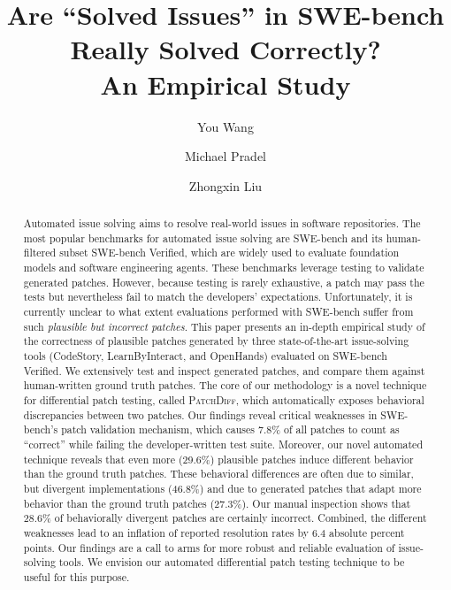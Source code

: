 \documentclass[sigconf]{acmart}
\newcommand{\appname}{{\textsc{PatchDiff}}\xspace}
\begin{document}
\title[Are ``Solved Issues'' in SWE-bench Really Solved Correctly?]{Are ``Solved Issues'' in SWE-bench Really Solved Correctly? \\An Empirical Study}

\author{You Wang}

\author{Michael Pradel}

\author{Zhongxin Liu}










\begin{abstract}


Automated issue solving aims to resolve real-world issues in software repositories.
The most popular benchmarks for automated issue solving are SWE-bench and its human-filtered subset SWE-bench Verified, which are widely used to evaluate foundation models and software engineering agents.
These benchmarks leverage testing to validate generated patches.
However, because testing is rarely exhaustive, a patch may pass the tests but nevertheless fail to match the developers' expectations.
Unfortunately, it is currently unclear to what extent evaluations performed with SWE-bench suffer from such \emph{plausible but incorrect patches}.
This paper presents an in-depth empirical study of the correctness of plausible patches generated by three state-of-the-art issue-solving tools (CodeStory, LearnByInteract, and OpenHands) evaluated on SWE-bench Verified.
We extensively test and inspect generated patches, and compare them against human-written ground truth patches.
The core of our methodology is a novel technique for differential patch testing, called \appname, which automatically exposes behavioral discrepancies between two patches.
Our findings reveal critical weaknesses in SWE-bench's patch validation mechanism, which causes 7.8\% of all patches to count as ``correct'' while failing the developer-written test suite.
Moreover, our novel automated technique reveals that even more (29.6\%) plausible patches induce different behavior than the ground truth patches.
These behavioral differences are often due to similar, but divergent implementations (46.8\%) and due to generated patches that adapt more behavior than the ground truth patches (27.3\%).
Our manual inspection shows that 28.6\% of behaviorally divergent patches are certainly incorrect.
Combined, the different weaknesses lead to an inflation of reported resolution rates by 6.4 absolute percent points.
Our findings are a call to arms for more robust and reliable evaluation of issue-solving tools.
We envision our automated differential patch testing technique to be useful for this purpose.
\end{abstract}
\end{document}
